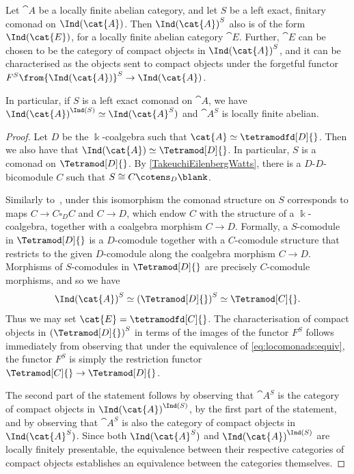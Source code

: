 \begin{proposition}\label{locomonads}
  Let \(\cat{A}\) be a locally finite abelian category,
  and let \(S\) be a left exact,
  finitary comonad on \(\Ind(\cat{A})\).
  Then \({\Ind(\cat{A})}^{S}\) also is of the form \(\Ind(\cat{E})\),
  for a locally finite abelian category \(\cat{E}\).
  Further, \(\cat{E}\) can be chosen to be the category of compact objects in \({\Ind(\cat{A})}^S\),
  and it can be characterised as the objects sent to compact objects under the forgetful functor \(F^S\from {\Ind(\cat{A})}^S \to \Ind(\cat{A})\).

  In particular, if \(S\) is a left exact comonad on \(\cat{A}\),
  we have \({\Ind(\cat{A})}^{\Ind(S)} \simeq \Ind(\cat{A}^S)\)
  and \(\cat{A}^S\) is locally finite abelian.
\end{proposition}
\begin{proof}
  Let \(D\) be the \(\Bbbk\)\hyp{}coalgebra such that \(\cat{A} \simeq \tetramodfd[D]{}\).
  Then we also have that \(\Ind(\cat{A}) \simeq \Tetramod[D]{}\).
  In particular, \(S\) is a comonad on \(\Tetramod[D]{}\).
  By \cref{TakeuchiEilenbergWatts}, there is a \(D\)\hyp{}\(D\)\hyp{}bicomodule \(C\) such that \(S \cong C \cotens_D \blank\).

  Similarly to~\cite[Remark~2.4]{takeuchi77:morit},
  under this isomorphism the comonad structure on \(S\) corresponds
  to maps \(C \to C \square_{D} C\) and \(C \to D\),
  which endow \(C\) with the structure of a \(\Bbbk\)\hyp{}coalgebra,
  together with a coalgebra morphism \(C \to D\).
  Formally, a \(S\)\hyp{}comodule in \(\Tetramod[D]{}\) is a \(D\)\hyp{}comodule
  together with a \(C\)\hyp{}comodule structure
  that restricts to the given \(D\)\hyp{}comodule along the coalgebra morphism \(C \to D\).
  Morphisms of \(S\)\hyp{}comodules in \(\Tetramod[D]{}\) are precisely \(C\)\hyp{}comodule morphisms,
  and so we have
  \begin{equation}\label{eq:locomonads:equiv}
    {\Ind(\cat{A})}^{S} \simeq {(\Tetramod[D]{})}^{S} \simeq \Tetramod[C]{}.
  \end{equation}
  Thus we may set \(\cat{E} = \tetramodfd[C]{}\).
  The characterisation of compact objects in \({(\Tetramod[D]{})}^{S}\)
  in terms of the images of the functor \(F^{S}\) follows immediately from observing that
  under the equivalence of \cref{eq:locomonads:equiv},
  the functor \(F^{S}\) is simply the restriction functor \(\Tetramod[C]{} \to \Tetramod[D]{}\).

  The second part of the statement follows by observing that \(\cat{A}^S\) is the category of compact objects in \({\Ind(\cat{A})}^{\Ind(S)}\),
  by the first part of the statement,
  and by observing that \(\cat{A}^S\) is also the category of compact objects in \(\Ind(\cat{A}^S)\).
  Since both \(\Ind(\cat{A}^S)\) and \({\Ind(\cat{A})}^{\Ind(S)}\) are locally finitely presentable,
  the equivalence between their respective categories of compact objects establishes
  an equivalence between the categories themselves.
\end{proof}

